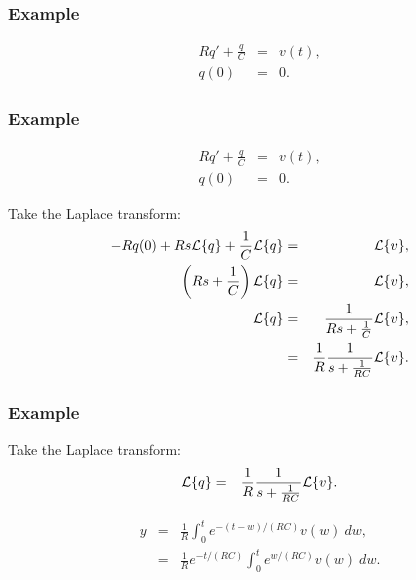 \begin{frame}
  \frametitle{Example}


  {
    \begin{eqnarray*}
      R q' + \frac{q}{C} & = & v(t), \\
      q(0) & = & 0.
    \end{eqnarray*}
  }

\end{frame}

\begin{frame}
  \frametitle{Example}

    \begin{eqnarray*}
      R q' + \frac{q}{C} & = & v(t), \\
      q(0) & = & 0.
    \end{eqnarray*}

  {
    Take the Laplace transform:
    \begin{eqnarray*}
      -R q(0) + Rs\laplace{q} + \frac{1}{C} \laplace{q} & = & \laplace{v}, \\
      \lp Rs+\frac{1}{C} \rp \laplace{q}  & = & \laplace{v}, \\
      \laplace{q}  & = & \frac{1}{Rs+\frac{1}{C}} \laplace{v}, \\
      & = & \frac{1}{R} \frac{1}{s + \frac{1}{RC}} \laplace{v}.
    \end{eqnarray*}
  }


\end{frame}


\begin{frame}
  \frametitle{Example}


    Take the Laplace transform:
    \begin{eqnarray*}
      \laplace{q}  & = & \frac{1}{R} \frac{1}{s + \frac{1}{RC}} \laplace{v}.
    \end{eqnarray*}

  {

    \begin{eqnarray*}
      y & = & \frac{1}{R} \int^t_0 e^{-(t-w)/(RC)} v(w) ~ dw, \\
      & = & \frac{1}{R} e^{-t/(RC)} \int^t_0 e^{w/(RC)} v(w) ~ dw.
    \end{eqnarray*}

  }


\end{frame}




